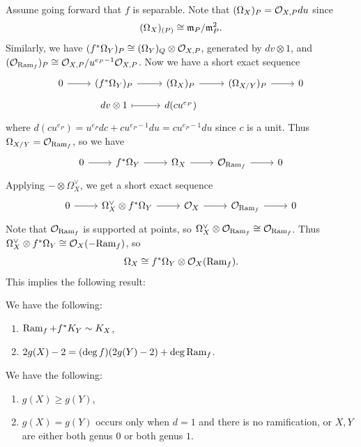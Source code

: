 \begin{remark}
  Assume going forward that $f$ is separable.
  Note that $(\Omega_X)_P = \mathcal{O}_{X, P} du$
  since
  \[
    (\Omega_X)_{(P)}
    \cong \mathfrak{m}_P / \mathfrak{m}_P^2.
  \]
  Similarly, we have
  $(f^* \Omega_Y)_P \cong (\Omega_Y)_Q \otimes \mathcal{O}_{X, P}$,
  generated by $dv \otimes 1$, and
  $(\mathcal{O}_{\operatorname{Ram}_f})_P \cong \mathcal{O}_{X, P} / u^{e_P - 1} \mathcal{O}_{X, P}$.
  Now we have a short exact sequence
  \[
    \begin{tikzcd}[row sep=tiny]
      0 \ar[r] & (f^* \Omega_Y)_P
      \ar[r] & (\Omega_X)_P
      \ar[r] & (\Omega_{X / Y})_P \ar[r] & 0 \\
             & dv \otimes 1\ar[r, mapsto]
             & d(cu^{e_P})
    \end{tikzcd}
  \]
  where $d(cu^{e_P}) = u^{e_P} dc + cu^{e_P - 1} du = cu^{e_P - 1} du$ since $c$ is a unit.
  Thus $\Omega_{X / Y} = \mathcal{O}_{\operatorname{Ram}_f}$, so we have
  \[
    \begin{tikzcd}
      0 \ar[r]
      & f^* \Omega_Y \ar[r]
      & \Omega_X \ar[r] & \OO_{\Ram_f} \ar[r] & 0
    \end{tikzcd}
  \]
  Applying $- \otimes \Omega_X^\vee$, we
  get a short exact sequence
  \[
    \begin{tikzcd}
      0 \ar[r] & \Omega_X^\vee \otimes f^* \Omega_Y
      \ar[r] & \OO_X \ar[r] & \OO_{\Ram_f} \ar[r] & 0
    \end{tikzcd}
  \]
  Note that $\mathcal{O}_{\operatorname{Ram}_f}$ is supported
  at points, so
  $\Omega_X^\vee \otimes \mathcal{O}_{\operatorname{Ram}_f} \cong \mathcal{O}_{\operatorname{Ram}_f}$.
  Thus
  $\Omega_X^\vee
    \otimes f^* \Omega_Y
    \cong \mathcal{O}_X(-{\operatorname{Ram}_f})$,
  so
  \[
    \Omega_X
    \cong f^* \Omega_Y \otimes \mathcal{O}_X(\operatorname{Ram}_f).
  \]
  This implies the following result:
\end{remark}

\begin{theorem}
  We have the following:
  \begin{enumerate}
    \item $\operatorname{Ram}_f + f^* K_Y \sim K_X$,
    \item $2 g(X) - 2 = (\deg f)(2g(Y) - 2) + \deg \operatorname{Ram}_f$.
  \end{enumerate}
\end{theorem}

\begin{remark}
  We have the following:
  \begin{enumerate}
    \item $g(X) \ge g(Y)$,
    \item $g(X) = g(Y)$ occurs only when
      $d = 1$ and there is no ramification, or
      $X, Y$ are either both genus $0$ or
      both genus $1$.
  \end{enumerate}
\end{remark}

